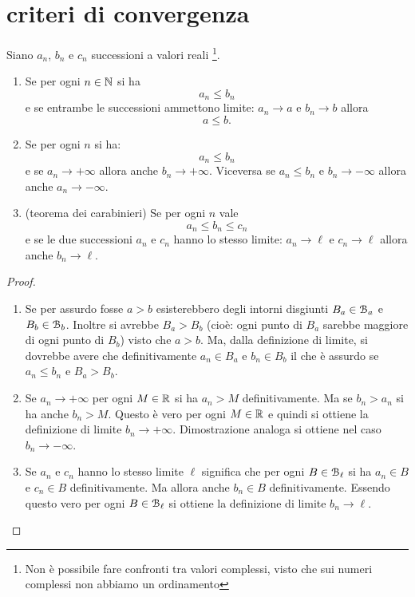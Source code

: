\section{criteri di convergenza}

\begin{theorem}
\mymark{***}
Siano $a_n$, $b_n$ e $c_n$ successioni a valori reali%
\footnote{Non è possibile fare confronti tra valori complessi, visto che
sui numeri complessi non abbiamo un ordinamento}.
\begin{enumerate}
\item
Se per ogni $n\in \mathbb N$ si ha
\[
a_n \le b_n
\]
e se entrambe le successioni ammettono limite: $a_n \to a$ e $b_n \to b$
allora
\[
a \le b.
\]

\item
Se per ogni $n$ si ha:
\[
a_n \le b_n
\]
e se $a_n\to +\infty$ allora anche $b_n \to +\infty$.
Viceversa se $a_n \le b_n$ e $b_n \to -\infty$ allora anche $a_n \to -\infty$.

\item
(teorema dei carabinieri)
Se per ogni $n$ vale
\[
a_n \le b_n \le c_n
\]
 e se le due
successioni $a_n$ e $c_n$ hanno lo stesso limite: $a_n \to \ell$ e $c_n\to \ell$
allora anche $b_n \to \ell$.
\end{enumerate}
\end{theorem}
%
\begin{proof}
\mymark{**}
\begin{enumerate}
\item
Se per assurdo fosse $a > b$ esisterebbero degli intorni disgiunti $B_a\in \mathcal B_a$
e $B_b \in \mathcal B_b$.
Inoltre si avrebbe $B_a > B_b$ (cioè: ogni punto di $B_a$ sarebbe maggiore
di ogni punto di $B_b$) visto che $a>b$.
Ma, dalla definizione di limite,
si dovrebbe avere che definitivamente $a_n\in B_a$ e $b_n\in B_b$ il che
è assurdo se $a_n\le b_n$ e $B_a > B_b$.

\item
Se $a_n \to +\infty$ per ogni $M\in \mathbb R$
si ha $a_n > M$ definitivamente.
Ma se $b_n>a_n$ si ha anche $b_n >M$.
Questo è vero per ogni $M\in \mathbb R$ e quindi
si ottiene la definizione di limite $b_n \to +\infty$.
Dimostrazione analoga si ottiene nel caso $b_n \to -\infty$.

\item
Se $a_n$ e $c_n$ hanno lo stesso limite $\ell$ significa che per ogni
$B \in \mathcal B_\ell$
si ha $a_n\in B$ e $c_n\in B$ definitivamente.
Ma allora anche $b_n\in B$ definitivamente. Essendo questo
vero per ogni $B\in \mathcal B_\ell$ si ottiene la definizione di limite
$b_n \to \ell$.
\end{enumerate}
\end{proof}


